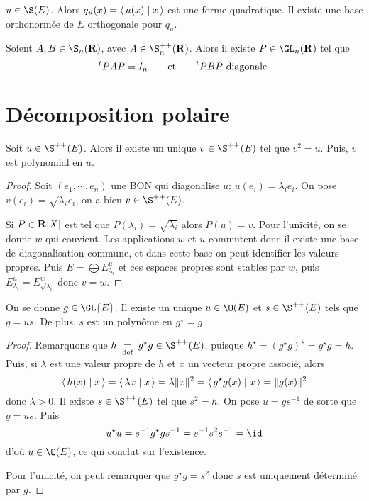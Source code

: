 \begin{cor}
    $u \in  \S(E)$. Alors $q_u(x)= \scalar{u(x)}{x} $ est une forme quadratique. Il existe une base orthonormée de $E$ orthogonale pour $q_u$.
\end{cor}

\begin{cor}
    Soient $A, B \in  \S_n(\R)$, avec $A \in  \S_n^{++}(\R)$. Alors il existe $P \in  \GL_n(\R)$ tel que \[
        {}^t PAP=I_n \qquad \text{et}\qquad  {}^t PBP\text{ diagonale }
    \]
\end{cor}


\section{Décomposition polaire}

\begin{prop}
    Soit $u \in  \S^{++}(E)$. Alors il existe un unique $v \in  \S ^{++}(E)$ tel que $v^2 =u$. Puis, $v$ est polynomial en  $u$.
\end{prop}

\begin{proof}
    Soit $(e_1, \cdots , e_n)$ une BON qui diagonalise $u$:  $ u(e_i)=\lambda_i e_i$. On pose $v(e_i)=\sqrt{\lambda_i}e_i$, on a bien  $v \in  \S ^{++}(E)$.

    Si $P \in  \mathbf R[X]$ est tel que $P(\lambda_i)=\sqrt{\lambda_i}$ alors  $P(u)=v$. Pour l'unicité, on se donne  $w$ qui convient. Les applications  $w$ et  $u$ commutent donc il existe une base de diagonalisation commune, et dans cette base on peut identifier les valeurs propres. Puis  $E=\bigoplus E_{\lambda_i}^u$ et  ces espaces propres sont stables par  $w$, puis  $E_{\lambda_i}^u=E_{\sqrt{\lambda_i}}^w$ donc  $v=w$.
\end{proof}

\begin{thm}
    On se donne $g \in  \GL{E}$. Il existe un unique $u \in  \O(E)$ et $s \in  \S ^{++}(E)$ tels que $g=us$. De plus,  $s$ est un polynôme en  $g^\star=g$
\end{thm}

\begin{proof}
    Remarquons que $h\defeq g^\star g \in  \S ^{++}(E)$, puisque $h^\star=(g^\star g)^\star=g^\star g=h$. Puis, si  $\lambda$ est une valeur propre de  $h$ et  $x$ un vecteur propre associé, alors  \[
        \scalar{h(x)}{x} = \scalar{\lambda x}{x} = \lambda \|x\|^2 = \scalar{g^\star g (x)}{x} = \|g(x)\|^2 
    \] 
    donc $ \lambda >0$. Il existe $s \in \S^{ ++ }(E)$ tel que $s^2 =h$. On pose $u=gs^{-1}$ de sorte que $g=us$. Puis  \[
    u^\star u=s^{-1}g^\star g s^{-1}=s ^{-1} s^2 s ^{-1}=\id
    \] 
    d'où $u \in  \O(E)$, ce qui conclut sur l'existence.

    Pour l'unicité, on peut remarquer que $g^\star g=s^2$ donc  $s$ est uniquement déterminé par  $g$.
\end{proof}
